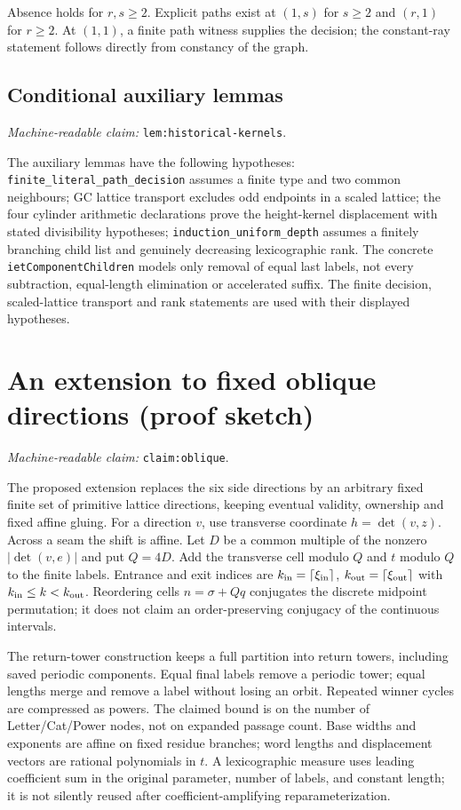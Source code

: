 \documentclass[11pt]{amsart}
\newcommand{\record}[1]{\nolinkurl{#1}}
\newcommand{\claimid}[1]{\par\nopagebreak\noindent\textit{Machine-readable claim:} \record{#1}.\par}
\theoremstyle{definition}\newtheorem{definition}{Definition}
\begin{document}
Absence holds for $r,s\ge2$. Explicit paths exist at $(1,s)$ for
$s\ge2$ and $(r,1)$ for $r\ge2$. At $(1,1)$, a finite path witness
supplies the decision; the constant-ray statement follows directly
from constancy of the graph.

\subsection{Conditional auxiliary lemmas}\label{sec:historical-formal}
\label{lem:historical-kernels}\claimid{lem:historical-kernels}
The auxiliary lemmas have the following hypotheses:
\record{finite_literal_path_decision} assumes a finite type and two
common neighbours; GC lattice transport excludes odd endpoints in a
scaled lattice; the four cylinder arithmetic declarations prove the
height-kernel displacement with stated divisibility hypotheses;
\record{induction_uniform_depth} assumes a finitely branching child
list and genuinely decreasing lexicographic rank. The concrete
\record{ietComponentChildren} models only removal of equal last labels,
not every subtraction, equal-length elimination or accelerated suffix.
The finite decision, scaled-lattice transport and rank statements
are used with their displayed hypotheses.

\label{sec:formal-records}
\section{An extension to fixed oblique directions (proof sketch)}\label{sec:extension}
\label{claim:oblique}\claimid{claim:oblique}
The proposed extension replaces the six side directions by an arbitrary
fixed finite set of primitive lattice directions, keeping eventual
validity, ownership and fixed affine gluing. For a direction $v$, use
transverse coordinate $h=\det(v,z)$. Across a seam the shift is affine.
Let $D$ be a common multiple of the nonzero $|\det(v,e)|$ and put
$Q=4D$. Add the transverse cell modulo $Q$ and $t$ modulo $Q$ to the
finite labels. Entrance and exit indices are
$k_{\rm in}=\lceil\xi_{\rm in}\rceil$,
$k_{\rm out}=\lceil\xi_{\rm out}\rceil$ with
$k_{\rm in}\le k<k_{\rm out}$. Reordering cells $n=\sigma+Qq$
conjugates the discrete midpoint permutation; it does not claim an
order-preserving conjugacy of the continuous intervals.

The return-tower construction keeps a full partition into return towers,
including saved periodic components. Equal final labels remove a
periodic tower; equal lengths merge and remove a label without losing
an orbit. Repeated winner cycles are compressed as powers. The claimed
bound is on the number of Letter/Cat/Power nodes, not on expanded
passage count. Base widths and exponents are affine on fixed residue
branches; word lengths and displacement vectors are rational
polynomials in $t$. A lexicographic measure uses leading coefficient
sum in the original parameter, number of labels, and constant length;
it is not silently reused after coefficient-amplifying reparameterization.
\end{document}
